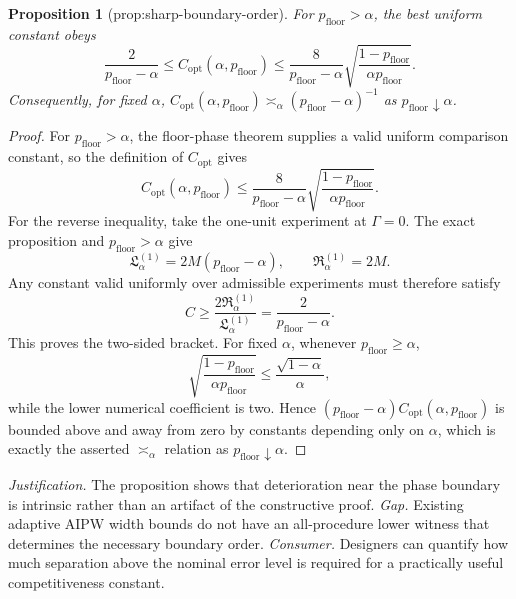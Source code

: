 \documentclass{article}
\newtheorem{proposition}{Proposition}
\begin{document}
\begin{proposition}[prop:sharp-boundary-order]\label{prop:sharp-boundary-order}
For \(p_{\mathrm{floor}}>\alpha\), the best uniform constant obeys \[\frac{2}{p_{\mathrm{floor}}-\alpha}\le C_{\mathrm{opt}}(\alpha,p_{\mathrm{floor}})\le\frac{8}{p_{\mathrm{floor}}-\alpha}\sqrt{\frac{1-p_{\mathrm{floor}}}{\alpha p_{\mathrm{floor}}}}.\] Consequently, for fixed \(\alpha\), \(C_{\mathrm{opt}}(\alpha,p_{\mathrm{floor}})\asymp_\alpha(p_{\mathrm{floor}}-\alpha)^{-1}\) as \(p_{\mathrm{floor}}\downarrow\alpha\).
\end{proposition}
\begin{proof}
For \(p_{\mathrm{floor}}>\alpha\), the floor-phase theorem supplies a valid uniform comparison constant, so the definition of \(C_{\mathrm{opt}}\) gives
\[
 C_{\mathrm{opt}}(\alpha,p_{\mathrm{floor}})
 \le\frac{8}{p_{\mathrm{floor}}-\alpha}
 \sqrt{\frac{1-p_{\mathrm{floor}}}{\alpha p_{\mathrm{floor}}}}.
\]
For the reverse inequality, take the one-unit experiment at \(\Gamma=0\).  The exact proposition and \(p_{\mathrm{floor}}>\alpha\) give
\[
 \mathfrak L_\alpha^{(1)}=2M(p_{\mathrm{floor}}-\alpha),
 \qquad
 \mathfrak R_\alpha^{(1)}=2M.
\]
Any constant valid uniformly over admissible experiments must therefore satisfy
\[
 C\ge\frac{2\mathfrak R_\alpha^{(1)}}
 {\mathfrak L_\alpha^{(1)}}
 =\frac{2}{p_{\mathrm{floor}}-\alpha}.
\]
This proves the two-sided bracket.  For fixed \(\alpha\), whenever \(p_{\mathrm{floor}}\ge\alpha\),
\[
 \sqrt{\frac{1-p_{\mathrm{floor}}}{\alpha p_{\mathrm{floor}}}}
 \le\frac{\sqrt{1-\alpha}}{\alpha},
\]
while the lower numerical coefficient is two.  Hence \((p_{\mathrm{floor}}-\alpha)C_{\mathrm{opt}}(\alpha,p_{\mathrm{floor}})\) is bounded above and away from zero by constants depending only on \(\alpha\), which is exactly the asserted \(\asymp_\alpha\) relation as \(p_{\mathrm{floor}}\downarrow\alpha\).
\end{proof}
\par\smallskip\noindent \textit{Justification.} The proposition shows that deterioration near the phase boundary is intrinsic rather than an artifact of the constructive proof. \textit{Gap.} Existing adaptive AIPW width bounds do not have an all-procedure lower witness that determines the necessary boundary order. \textit{Consumer.} Designers can quantify how much separation above the nominal error level is required for a practically useful competitiveness constant.
\end{document}
